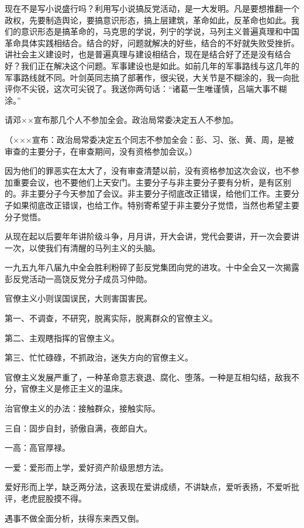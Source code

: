 现在不是写小说盛行吗？利用写小说搞反党活动，是一大发明。凡是要想推翻一个政权，先要制造舆论，要搞意识形态，搞上层建筑，革命如此，反革命也如此。我们的意识形态是搞革命的，马克思的学说，列宁的学说，马列主义普遍真理和中国革命具体实践相结合。结合的好，问题就解决的好些，结合的不好就失败受挫折。讲社会主义建设时，也是普遍真理与建设相结合，现在是结合好了还是没有结合好？我们正在解决这个问题。军事建设也是如此。如前几年的军事路线与这几年的军事路线就不同。叶剑英同志搞了部著作，很尖锐，大关节是不糊涂的，我一向批评你不尖锐，这次可尖锐了。我送你两句话：“诸葛一生唯谨慎，吕端大事不糊涂。”

请邓××宣布那几个人不参加全会。政治局常委决定五人不参加。

（×××宣布：政治局常委决定五个同志不参加全会：彭、习、张、黄、周，是被审查的主要分子，在审查期间，没有资格参加会议。）

因为他们的罪恶实在太大了，没有审查清楚以前，没有资格参加这次会议，也不参加重要会议，也不要他们上天安门。主要分子与非主要分子要有分析，是有区别的。非主要分子今天参加了会议。非主要分子彻底改正错误，给他们工作。主要分子如果彻底改正错误，也给工作。特别寄希望于非主要分子觉悟，当然也希望主要分子觉悟。

从现在起以后要年年讲阶级斗争，月月讲，开大会讲，党代会要讲，开一次会要讲一次，以使我们有清醒的马列主义的头脑。

一九五九年八届九中全会胜利粉碎了彭反党集团向党的进攻。十中全会又一次揭露彭反党活动一高饶反党分子成员习仲勋。


官僚主义小则误国误民，大则害国害民。

第一、不调查，不研究，脱离实际，脱离群众的官僚主义。

第二、主观瞎指挥的官僚主义。

第三、忙忙碌碌，不抓政治，迷失方向的官僚主义。

官僚主义发展严重了，一种革命意志衰退、腐化、堕落。一种是互相勾结，敌我不分，官僚主义是修正主义的温床。

治官僚主义的办法：接触群众，接触实际。

三自：固步自封，骄傲自满，夜郎自大。

一高：高官厚禄。

一爱：爱形而上学，爱好资产阶级思想方法。

爱好形而上学，缺乏两分法，这表现在爱讲成绩，不讲缺点，爱听表扬，不爱听批评，老虎屁股摸不得。

遇事不做全面分析，扶得东来西又倒。


